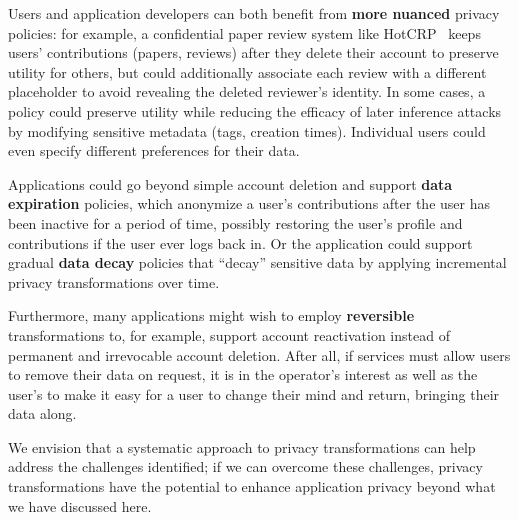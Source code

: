 %
Users and application developers can both benefit from \textbf{more nuanced} privacy policies:
for example, a confidential paper review system like HotCRP~\cite{hotcrp} keeps users'
contributions (papers, reviews) after they delete their account to preserve utility for others, but
could additionally associate each review with a different placeholder to avoid revealing the deleted
reviewer's identity.
%
In some cases, a policy could preserve utility while reducing the efficacy of later inference
attacks by \eg modifying sensitive metadata (\eg tags, creation times).
%
%
%
Individual users could even specify different preferences for their data.
%
%

%
Applications could go beyond simple account deletion and support \textbf{data
expiration} policies, which anonymize a user's contributions after the user has been inactive for a
period of time, possibly restoring the user's profile and contributions if the user ever logs back
in.
%
Or the application could support gradual \textbf{data decay} policies that ``decay'' sensitive data
by applying incremental privacy transformations over time.

Furthermore, many applications might wish to employ \textbf{reversible} transformations to, for
example, support account reactivation instead of permanent and irrevocable account deletion.
%
After all, if services must allow users to remove their data on request, it is in the operator's
interest as well as the user's to make it easy for a user to change their mind and return, bringing
their data along.

We envision that a systematic approach to privacy transformations can help address the challenges
identified; if we can overcome these challenges, privacy transformations have the potential to enhance application
privacy beyond what we have discussed here.
